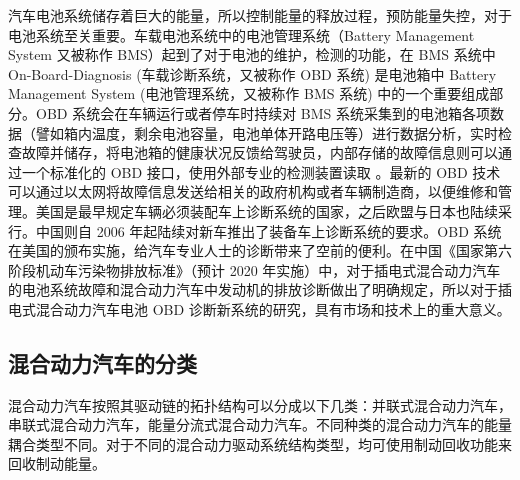 汽车电池系统储存着巨大的能量，所以控制能量的释放过程，预防能量失控，对于电池系统至关重要。车载电池系统中的电池管理系统（Battery Management System 又被称作 BMS）起到了对于电池的维护，检测的功能，在 BMS 系统中 On-Board-Diagnosis (车载诊断系统，又被称作 OBD 系统) 是电池箱中 Battery Management System (电池管理系统，又被称作 BMS 系统) 中的一个重要组成部分。OBD 系统会在车辆运行或者停车时持续对 BMS 系统采集到的电池箱各项数据（譬如箱内温度，剩余电池容量，电池单体开路电压等）进行数据分析，实时检查故障并储存，将电池箱的健康状况反馈给驾驶员，内部存储的故障信息则可以通过一个标准化的 OBD 接口，使用外部专业的检测装置读取 \cite{鲁学柱2006OBD技术及其发展}。最新的 OBD 技术可以通过以太网将故障信息发送给相关的政府机构或者车辆制造商，以便维修和管理。美国是最早规定车辆必须装配车上诊断系统的国家，之后欧盟与日本也陆续采行。中国则自 2006 年起陆续对新车推出了装备车上诊断系统的要求。OBD 系统在美国的颁布实施，给汽车专业人士的诊断带来了空前的便利。在中国《国家第六阶段机动车污染物排放标准》（预计 2020 年实施）中，对于插电式混合动力汽车的电池系统故障和混合动力汽车中发动机的排放诊断做出了明确规定，所以对于插电式混合动力汽车电池 OBD 诊断新系统的研究，具有市场和技术上的重大意义。

\subsection{混合动力汽车的分类}

混合动力汽车按照其驱动链的拓扑结构可以分成以下几类：并联式混合动力汽车，串联式混合动力汽车，能量分流式混合动力汽车。不同种类的混合动力汽车的能量耦合类型不同。对于不同的混合动力驱动系统结构类型，均可使用制动回收功能来回收制动能量。


